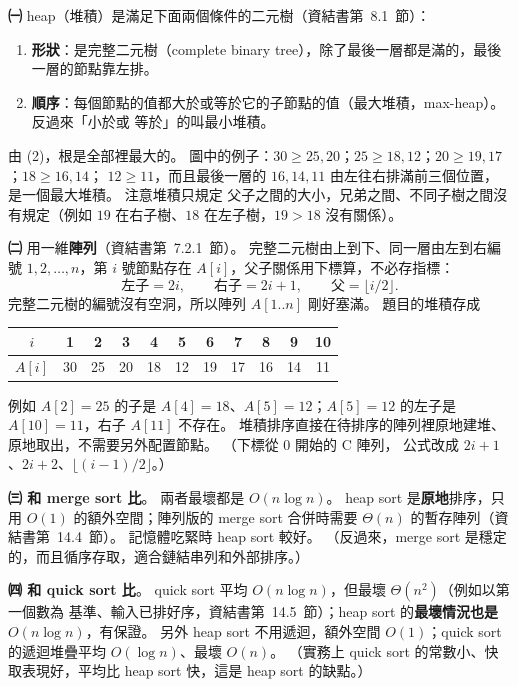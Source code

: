 \begin{pastsoln}
\textbf{㈠} heap（堆積）是滿足下面兩個條件的二元樹（資結書第~8.1~節）：
\begin{enumerate}[label=(\arabic*)]
\item \textbf{形狀}：是完整二元樹（complete binary tree），除了最後一層都是滿的，最後一層的節點靠左排。
\item \textbf{順序}：每個節點的值都大於或等於它的子節點的值（最大堆積，max-heap）。 反過來「小於或
等於」的叫最小堆積。
\end{enumerate}
由 (2)，根是全部裡最大的。 圖中的例子：$30 \ge 25, 20$；$25 \ge 18, 12$；$20 \ge 19, 17$；$18 \ge 16, 14$；
$12 \ge 11$，而且最後一層的 $16, 14, 11$ 由左往右排滿前三個位置，是一個最大堆積。 注意堆積只規定
父子之間的大小，兄弟之間、不同子樹之間沒有規定（例如 $19$ 在右子樹、$18$ 在左子樹，$19 > 18$ 沒有關係）。

\textbf{㈡} 用一維\textbf{陣列}（資結書第~7.2.1~節）。 完整二元樹由上到下、同一層由左到右編號
$1, 2, \ldots, n$，第 $i$ 號節點存在 $A[i]$，父子關係用下標算，不必存指標：
\[
\text{左子} = 2i, \qquad \text{右子} = 2i + 1, \qquad \text{父} = \lfloor i/2 \rfloor .
\]
完整二元樹的編號沒有空洞，所以陣列 $A[1..n]$ 剛好塞滿。 題目的堆積存成
\begin{center}
\small
\begin{tabular}{c|cccccccccc}
$i$ & 1 & 2 & 3 & 4 & 5 & 6 & 7 & 8 & 9 & 10 \\
\hline
$A[i]$ & 30 & 25 & 20 & 18 & 12 & 19 & 17 & 16 & 14 & 11 \\
\end{tabular}
\end{center}
例如 $A[2] = 25$ 的子是 $A[4] = 18$、$A[5] = 12$；$A[5] = 12$ 的左子是 $A[10] = 11$，右子 $A[11]$ 不存在。
堆積排序直接在待排序的陣列裡原地建堆、原地取出，不需要另外配置節點。 （下標從 $0$ 開始的 C 陣列，
公式改成 $2i + 1$、$2i + 2$、$\lfloor (i - 1)/2 \rfloor$。）

\textbf{㈢ 和 merge sort 比}。 兩者最壞都是 $O(n \log n)$。 heap sort 是\textbf{原地}排序，只用
$O(1)$ 的額外空間；陣列版的 merge sort 合併時需要 $\Theta(n)$ 的暫存陣列（資結書第~14.4~節）。
記憶體吃緊時 heap sort 較好。 （反過來，merge sort 是穩定的，而且循序存取，適合鏈結串列和外部排序。）

\textbf{㈣ 和 quick sort 比}。 quick sort 平均 $O(n \log n)$，但最壞 $\Theta(n^2)$（例如以第一個數為
基準、輸入已排好序，資結書第~14.5~節）；heap sort 的\textbf{最壞情況也是} $O(n \log n)$，有保證。
另外 heap sort 不用遞迴，額外空間 $O(1)$；quick sort 的遞迴堆疊平均 $O(\log n)$、最壞 $O(n)$。
（實務上 quick sort 的常數小、快取表現好，平均比 heap sort 快，這是 heap sort 的缺點。）


\end{pastsoln}
